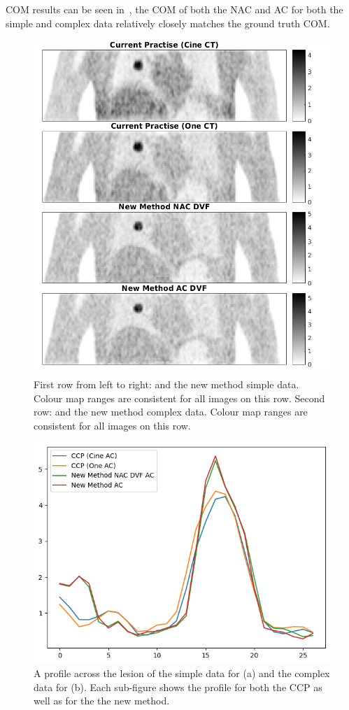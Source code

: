    \gls{COM} results can be seen in~, the \gls{COM} of both the \gls{NAC} and \gls{AC} for both the simple and complex data relatively closely matches the ground truth \gls{COM}.
    
    \begin{figure}
        \centering
        \includegraphics[width=1.0\linewidth]{figures/visual_analysis.png}
        \captionsetup{singlelinecheck=false, justification=centering}
        \caption{First row from left to right:  and the new method simple data. Colour map ranges are consistent for all images on this row. Second row:  and the new method complex data. Colour map ranges are consistent for all images on this row.}
        \label{fig:visual_analysis}
    \end{figure}
    
    \begin{figure}
        \centering
        \includegraphics[width=0.5\linewidth]{figures/profile.png}
        \captionsetup{singlelinecheck=false, justification=centering}
        \caption{A profile across the lesion of the simple data for (a) and the complex data for (b). Each sub-figure shows the profile for both the \gls{CCP} as well as for the the new method.}
        \label{fig:profile}
    \end{figure}
    
